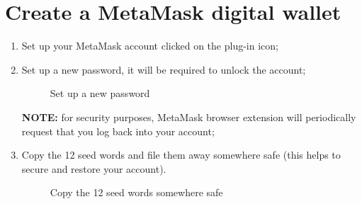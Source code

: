 \documentclass[ManualeUtente]{subfiles}
\begin{document}
\section{Create a MetaMask digital wallet}
\begin{enumerate}	
	\item Set up your MetaMask account clicked on the plug-in icon;
	\item Set up a new password, it will be required to unlock the account;
	\begin{figure}[H]
		\centering
		\caption{Set up a new password}
		\label{fig:Set up a new password}
	\end{figure}
	\textbf{NOTE:} for security purposes, MetaMask browser extension will periodically request that you log back into your account;
	\item Copy the 12 seed words and file them away somewhere safe (this helps to secure and restore your account).
	\begin{figure}[H]
		\centering
		\caption{Copy the 12 seed words somewhere safe}
		\label{fig:Copy the 12 seed words somewhere safe}
	\end{figure}
\end{enumerate}
\end{document}
